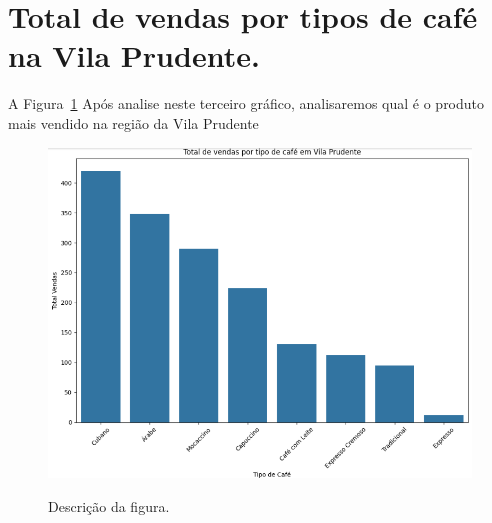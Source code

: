 \section{Total de vendas por tipos de café na Vila Prudente. }
\label{sec:figura}
A Figura~\ref{figuras/Total-vendas-Vila-Prudente.png} Após analise neste terceiro gráfico, analisaremos qual é o produto mais vendido na região da Vila Prudente
\begin{figure}[!ht]
	{\centering
		\caption{Descrição da figura.}
		\includegraphics[width=1.0\textwidth]{figuras/Total-vendas-Vila-Prudente.png}
		\label{figuras/Total-vendas-Vila-Prudente.png}
	}
\end{figure} \\ \\ \\ \\ \\ \\ \\ 


